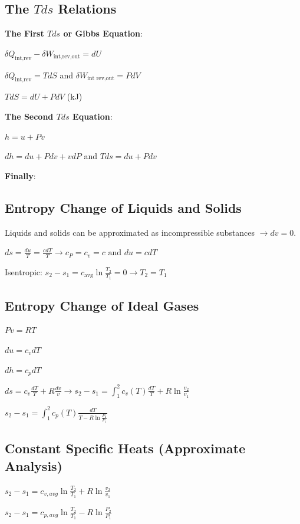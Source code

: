 \documentclass{article}
\begin{document}
\begin{multicols}{3}
    \subsection*{The $Tds$ Relations}
    \textbf{The First $Tds$ or Gibbs Equation}:\par 
    $\delta Q_\text{int,rev}-\delta W_\text{int,rev,out}=dU$\par 
    $\delta Q_\text{int,rev}=TdS$ and $\delta W_\text{int rev,out}=PdV$\par 
    $TdS=dU+PdV$ (kJ)\par 
    \par 
    \textbf{The Second $Tds$ Equation}:\par 
    $h=u+Pv$\par 
    $dh=du+Pdv+vdP$ and $Tds=du+Pdv$\par 
    \par 
    \textbf{Finally}:\par 
    \subsection*{Entropy Change of Liquids and Solids}
    Liquids and solids can be approximated as incompressible substances $\rightarrow dv=0$.\par 
    $ds=\frac{du}{T}=\frac{cdT}{T}\rightarrow c_P=c_v=c\text{ and }du=cdT$\par 
    \par 
    Isentropic: $s_2-s_1=c_\text{avg}\ln{\frac{T_2}{T_1}}=0\rightarrow T_2=T_1$
    \subsection*{Entropy Change of Ideal Gases}
    $Pv=RT$\par 
    $du=c_vdT$\par 
    $dh=c_pdT$\par 
    $ds=c_v\frac{dT}{T}+R\frac{dv}{v}\rightarrow s_2-s_1=\int_1^2c_v(T)\frac{dT}{T}+R\ln{\frac{v_2}{v_1}}$\par
    $s_2-s_1=\int_1^2c_p(T)\frac{dT}{T-R\ln{\frac{P_2}{P_1}}}$
    \subsection*{Constant Specific Heats (Approximate Analysis)}
    $s_2-s_1=c_{v,avg}\ln\frac{T_2}{T_1}+R\ln\frac{v_2}{v_1}$\par 
    $s_2-s_1=c_{p,avg}\ln\frac{T_2}{T_1}-R\ln\frac{P_2}{P_1}$

\end{multicols}
\end{document}
